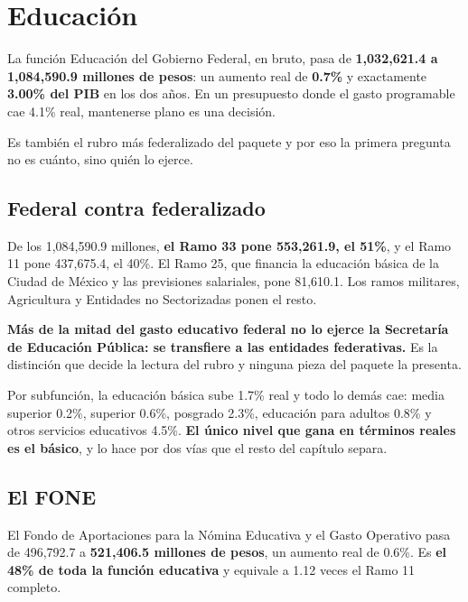 \chapter{Educación}

La función Educación del Gobierno Federal, en bruto, pasa de \textbf{1,032,621.4 a
1,084,590.9 millones de pesos}: un aumento real de \textbf{0.7\%} y exactamente
\textbf{3.00\% del PIB} en los dos años. En un presupuesto donde el gasto
programable cae 4.1\% real, mantenerse plano es una decisión.

Es también el rubro más federalizado del paquete y por eso la primera pregunta no
es cuánto, sino quién lo ejerce.

\section{Federal contra federalizado}



De los 1,084,590.9 millones, \textbf{el Ramo 33 pone 553,261.9, el 51\%}, y el
Ramo 11 pone 437,675.4, el 40\%. El Ramo 25, que financia la educación básica de
la Ciudad de México y las previsiones salariales, pone 81,610.1. Los ramos
militares, Agricultura y Entidades no Sectorizadas ponen el resto.

\textbf{Más de la mitad del gasto educativo federal no lo ejerce la Secretaría de
Educación Pública: se transfiere a las entidades federativas.} Es la distinción
que decide la lectura del rubro y ninguna pieza del paquete la presenta.

Por subfunción, la educación básica sube 1.7\% real y todo lo demás cae: media
superior 0.2\%, superior 0.6\%, posgrado 2.3\%, educación para adultos 0.8\% y
otros servicios educativos 4.5\%. \textbf{El único nivel que gana en términos
reales es el básico}, y lo hace por dos vías que el resto del capítulo separa.

\section{El FONE}

El Fondo de Aportaciones para la Nómina Educativa y el Gasto Operativo pasa de
496,792.7 a \textbf{521,406.5 millones de pesos}, un aumento real de 0.6\%. Es
\textbf{el 48\% de toda la función educativa} y equivale a 1.12 veces el Ramo 11
completo.



